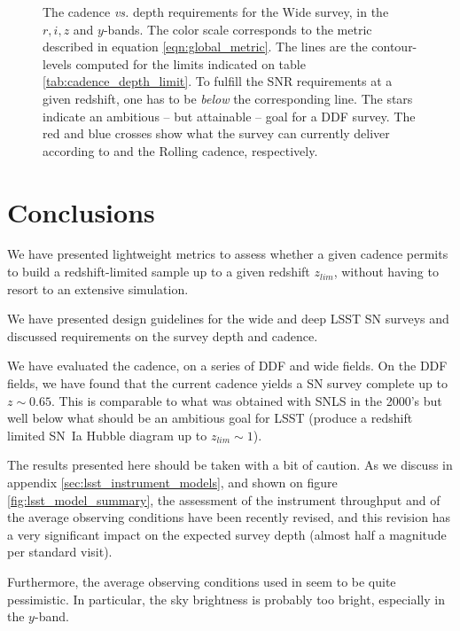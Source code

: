 \documentclass[\docopts]{\docclass}
\begin{document}
\begin{figure}[t]
\begin{center}
\caption{The cadence {\em vs.} depth requirements for the Wide survey,
  in the $r, i, z $ and $y$-bands. The color scale corresponds to the
  metric described in equation \ref{eqn:global_metric}.  The lines are
  the contour-levels computed for the limits indicated on table
  \ref{tab:cadence_depth_limit}. To fulfill the SNR requirements at a
  given redshift, one has to be {\em below} the corresponding
  line. The stars indicate an ambitious -- but attainable -- goal for
  a DDF survey.  The red and blue crosses show what the survey can currently
  deliver according to  and the Rolling cadence, respectively.}
\label{fig:m5_cadence_limits_rolling}
\end{center}
\end{figure}

\section{Conclusions}
\label{sec:conclusions}

We have presented lightweight metrics to assess whether a given
cadence permits to build a redshift-limited sample up to a given
redshift $z_{lim}$, without having to resort to an extensive
simulation.

We have presented design guidelines for the wide and deep LSST SN
surveys and discussed requirements on the survey depth and cadence.

We have evaluated the  cadence, on a series of DDF
and wide fields. On the DDF fields, we have found that the current
cadence yields a SN survey complete up to $z \sim 0.65$.  This is
comparable to what was obtained with SNLS in the 2000's but well below
what should be an ambitious goal for LSST (produce a redshift limited
SN~Ia Hubble diagram up to $z_{lim} \sim 1$).


The results presented here should be taken with a bit of caution.  As
we discuss in appendix \ref{sec:lsst_instrument_models}, and shown on
figure \ref{fig:lsst_model_summary}, the assessment of the instrument
throughput and of the average observing conditions have been recently
revised, and this revision has a very significant impact on the
expected survey depth (almost half a magnitude per standard visit).

Furthermore, the average observing conditions used in
 seem to be quite pessimistic.  In particular,
the  sky brightness is probably too bright,
especially in the $y$-band.
\end{document}
